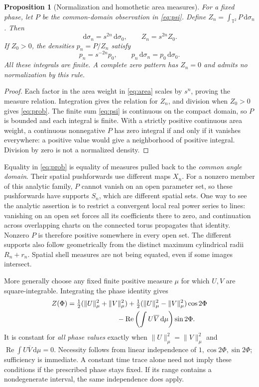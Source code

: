 \documentclass[11pt,a4paper]{article}
\newtheorem{proposition}[theorem]{Proposition}
\theoremstyle{definition}
\theoremstyle{remark}
\newcommand{\T}{\mathbb T}
\newcommand{\dd}{\,\mathrm d}
\newcommand{\Rea}{\operatorname{Re}}
\begin{document}
\begin{proposition}[Normalization and homothetic area measures]
\label{prop:normalization}
For a fixed phase, let $P$ be the common-domain observation
in \eqref{eq:psi}. Define
$Z_n=\int_{\T^2}P\dd\sigma_n$. Then
\[
 \dd\sigma_n=s^{2n}\dd\sigma_0,\qquad Z_n=s^{2n}Z_0.
 \]
If $Z_0>0$, the densities $p_n=P/Z_n$ satisfy
\begin{equation}
 p_n=s^{-2n}p_0,\qquad p_n\dd\sigma_n=p_0\dd\sigma_0.
 \label{eq:prob}
\end{equation}
All these integrals are finite. A complete zero pattern has
$Z_n=0$ and admits no normalization by this rule.
\end{proposition}
\begin{proof}
Each factor in the area weight in \eqref{eq:area} scales by
$s^n$, proving the measure relation. Integration gives the
relation for $Z_n$, and division when $Z_0>0$ gives
\eqref{eq:prob}. The finite sum \eqref{eq:psi} is continuous
on the compact domain, so $P$ is bounded and each integral
is finite. With a strictly positive continuous area weight,
a continuous nonnegative $P$ has zero integral if and only if
it vanishes everywhere: a positive value would give a
neighborhood of positive integral. Division by zero is not a
normalized density.
\end{proof}

Equality in \eqref{eq:prob} is equality of measures pulled
back to the \emph{common angle domain}. Their spatial
pushforwards use different maps $X_n$. For a nonzero member of
this analytic family, $P$ cannot vanish on an open parameter
set, so these pushforwards have supports $S_n$, which are
different spatial sets. One way to see the analytic assertion
is to restrict a convergent local real power series to lines:
vanishing on an open set forces all its coefficients there to
zero, and continuation across overlapping charts on the connected
torus propagates that identity. Nonzero $P$ is therefore
positive somewhere in every open set. The different supports
also follow geometrically from the distinct maximum cylindrical
radii $R_n+r_n$. Spatial shell measures are not being equated,
even if some images intersect.

More generally choose any fixed finite positive measure
$\mu$ for which $U,V$ are square-integrable. Integrating the
phase identity gives
\begin{align}
 Z(\Phi)&=\tfrac12(\|U\|_\mu^2+\|V\|_\mu^2)
 +\tfrac12(\|U\|_\mu^2-\|V\|_\mu^2)\cos2\Phi \notag\\
 &\hspace{25mm}
 -\Rea\left(\int U\overline V\dd\mu\right)\sin2\Phi.
 \label{eq:integralphase}
\end{align}
It is constant for \emph{all phase values} exactly when
$\|U\|_\mu^2=\|V\|_\mu^2$ and
$\Rea\int U\overline V\dd\mu=0$. Necessity follows from
linear independence of $1,\cos2\Phi,\sin2\Phi$; sufficiency
is immediate. A constant time trace alone need not imply
these conditions if the prescribed phase stays fixed. If its
range contains a nondegenerate interval, the same independence does apply.
\end{document}
